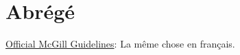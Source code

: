 \chapter*{\rm\bfseries Abr\'eg\'e}
\label{ch:abstratfr}

\href{https://www.mcgill.ca/gps/thesis/thesis-guidelines/preparation}{Official McGill Guidelines}: La même chose en français.